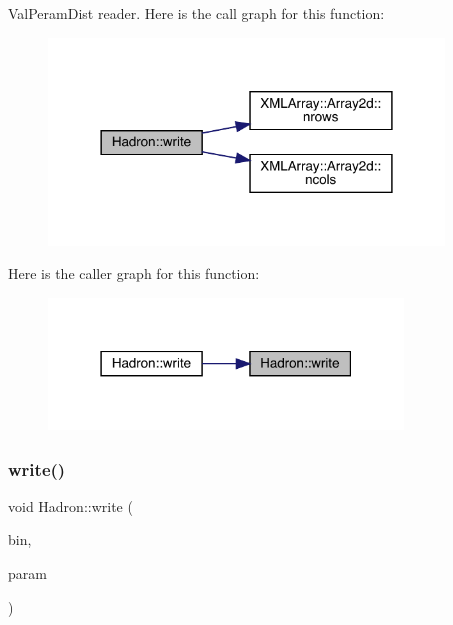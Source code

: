 Val\+Peram\+Dist reader. Here is the call graph for this function\+:
\nopagebreak
\begin{figure}[H]
\begin{center}
\leavevmode
\includegraphics[width=298pt]{d1/daf/namespaceHadron_afebbe26d622d0f830042509739bee2da_cgraph}
\end{center}
\end{figure}
Here is the caller graph for this function\+:
\nopagebreak
\begin{figure}[H]
\begin{center}
\leavevmode
\includegraphics[width=267pt]{d1/daf/namespaceHadron_afebbe26d622d0f830042509739bee2da_icgraph}
\end{center}
\end{figure}
\mbox{\label{namespaceHadron_a276bd4448f8f6233aa951856e912651e}} 
\subsubsection{\texorpdfstring{write()}{write()}\hspace{0.1cm}{\footnotesize\ttfamily [75/95]}}
{\footnotesize\ttfamily void Hadron\+::write (\begin{DoxyParamCaption}\item[{\mbox{\hyperlink{classADATIO_1_1BinaryWriter}{Binary\+Writer}} \&}]{bin,  }\item[{const \mbox{\hyperlink{structHadron_1_1ValGenPropElementalOperator__t}{Val\+Gen\+Prop\+Elemental\+Operator\+\_\+t}} \&}]{param }\end{DoxyParamCaption})}



